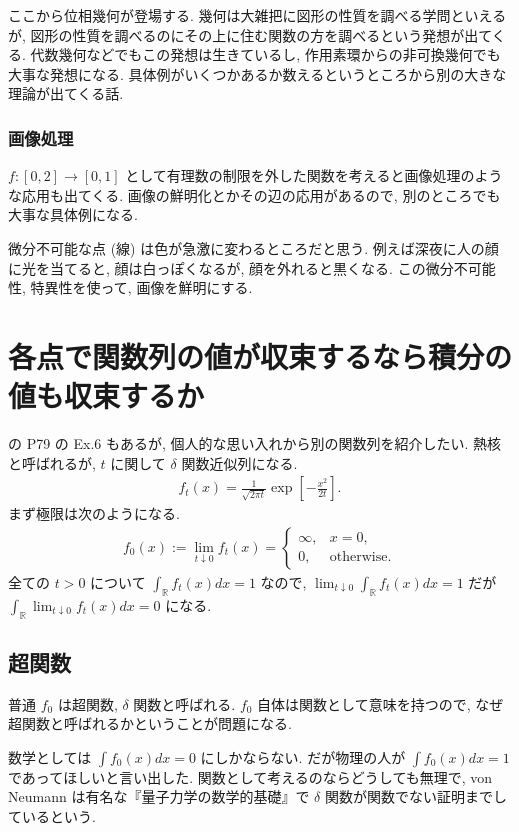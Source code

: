 \documentclass[openany, a4paper, oneside]{jsbook}
\begin{document}
ここから位相幾何が登場する.
幾何は大雑把に図形の性質を調べる学問といえるが, 図形の性質を調べるのにその上に住む関数の方を調べるという発想が出てくる.
代数幾何などでもこの発想は生きているし, 作用素環からの非可換幾何でも大事な発想になる.
具体例がいくつかあるか数えるというところから別の大きな理論が出てくる話.
\subsubsection{画像処理}

$f \colon [0,2] \to [0,1]$ として有理数の制限を外した関数を考えると画像処理のような応用も出てくる.
画像の鮮明化とかその辺の応用があるので, 別のところでも大事な具体例になる.

微分不可能な点 (線) は色が急激に変わるところだと思う.
例えば深夜に人の顔に光を当てると, 顔は白っぽくなるが, 顔を外れると黒くなる.
この微分不可能性, 特異性を使って, 画像を鮮明にする.
\section{各点で関数列の値が収束するなら積分の値も収束するか}

\cite{GelbaumOlmsted1} の P79 の Ex.6 もあるが, 個人的な思い入れから別の関数列を紹介したい.
熱核と呼ばれるが, $t$ に関して $\delta$ 関数近似列になる.
\begin{align}
 f_t (x)
 =
 \frac{1}{\sqrt{2 \pi t}} \exp \left[ - \frac{x^2}{2t} \right].
\end{align}
まず極限は次のようになる.
\begin{align}
 f_0 (x)
 :=
 \lim_{t \downarrow 0} f_t (x)
 =
 \begin{cases}
  \infty, & x = 0, \\
  0,      & \mathrm{otherwise}.
 \end{cases}
\end{align}
全ての $t > 0$ について $\int_{\mathbb{R}} f_t (x) dx = 1$ なので,
$\lim_{t \downarrow 0} \int_{\mathbb{R}} f_t (x) dx = 1$ だが
$\int_{\mathbb{R}} \lim_{t \downarrow 0} f_t (x) dx = 0$ になる.
\subsection{超関数}

普通 $f_0$ は超関数, $\delta$ 関数と呼ばれる.
$f_0$ 自体は関数として意味を持つので, なぜ超関数と呼ばれるかということが問題になる.

数学としては $\int f_0 (x) dx = 0$ にしかならない.
だが物理の人が $\int f_0 (x) dx = 1$ であってほしいと言い出した.
関数として考えるのならどうしても無理で, von Neumann は有名な『量子力学の数学的基礎』で $\delta$ 関数が関数でない証明までしているという.
\end{document}
